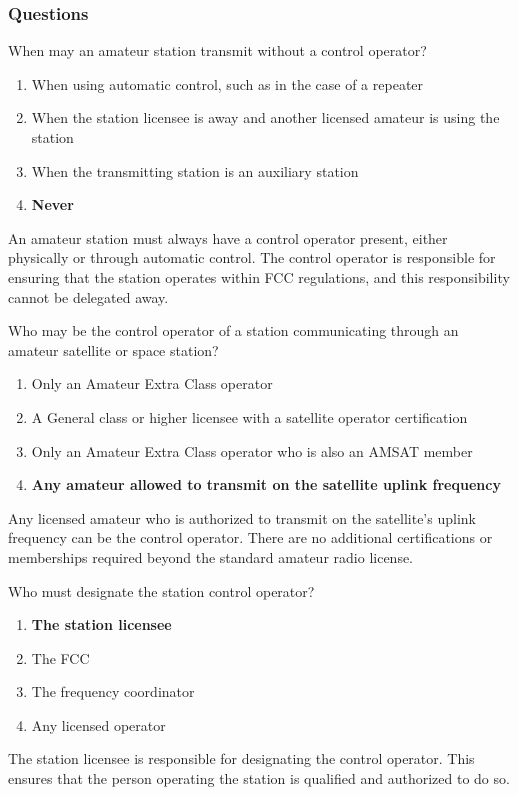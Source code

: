 \subsubsection*{Questions}

\begin{tcolorbox}[colback=gray!10!white,colframe=black!75!black,title={T1E01}]
    When may an amateur station transmit without a control operator?
    \begin{enumerate}[label=\Alph*),noitemsep]
        \item When using automatic control, such as in the case of a repeater
        \item When the station licensee is away and another licensed amateur is using the station
        \item When the transmitting station is an auxiliary station
        \item \textbf{Never}
    \end{enumerate}
\end{tcolorbox}
An amateur station must always have a control operator present, either physically or through automatic control. The control operator is responsible for ensuring that the station operates within FCC regulations, and this responsibility cannot be delegated away.

\begin{tcolorbox}[colback=gray!10!white,colframe=black!75!black,title={T1E02}]
    Who may be the control operator of a station communicating through an amateur satellite or space station?
    \begin{enumerate}[label=\Alph*),noitemsep]
        \item Only an Amateur Extra Class operator
        \item A General class or higher licensee with a satellite operator certification
        \item Only an Amateur Extra Class operator who is also an AMSAT member
        \item \textbf{Any amateur allowed to transmit on the satellite uplink frequency}
    \end{enumerate}
\end{tcolorbox}
Any licensed amateur who is authorized to transmit on the satellite's uplink frequency can be the control operator. There are no additional certifications or memberships required beyond the standard amateur radio license.

\begin{tcolorbox}[colback=gray!10!white,colframe=black!75!black,title={T1E03}]
    Who must designate the station control operator?
    \begin{enumerate}[label=\Alph*),noitemsep]
        \item \textbf{The station licensee}
        \item The FCC
        \item The frequency coordinator
        \item Any licensed operator
    \end{enumerate}
\end{tcolorbox}
The station licensee is responsible for designating the control operator. This ensures that the person operating the station is qualified and authorized to do so.

